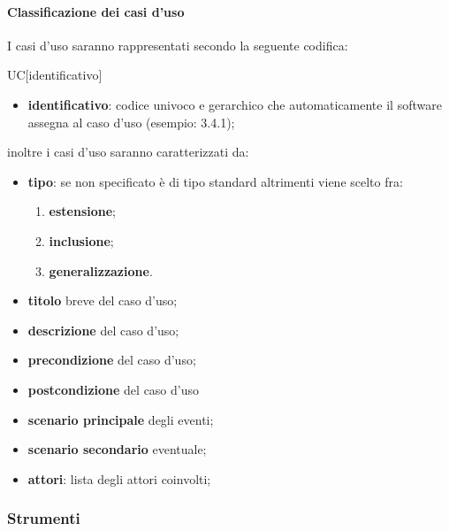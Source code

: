 		\paragraph{Classificazione dei casi d'uso}
		I casi d'uso saranno rappresentati secondo la seguente codifica:
		\begin{center}
			UC[identificativo]
		\end{center}
		\begin{itemize}
			\item \textbf{identificativo}: codice univoco e gerarchico che automaticamente il software assegna al caso d'uso (esempio: 3.4.1);
		\end{itemize}
		inoltre i casi d'uso saranno caratterizzati da:
		\begin{itemize}
			\item \textbf{tipo}: se non specificato è di tipo standard altrimenti viene scelto fra:
			\begin{enumerate}
				\item \textbf{estensione};
				\item \textbf{inclusione};
				\item \textbf{generalizzazione}.
			\end{enumerate}
			\item \textbf{titolo} breve del caso d'uso;
			\item \textbf{descrizione} del caso d'uso;
			\item \textbf{precondizione} del caso d'uso;
			\item \textbf{postcondizione} del caso d'uso 
			\item \textbf{scenario principale} degli eventi;
			\item \textbf{scenario secondario} eventuale;
			\item \textbf{attori}: lista degli attori coinvolti;
		\end{itemize}
\subsubsection{Strumenti}
